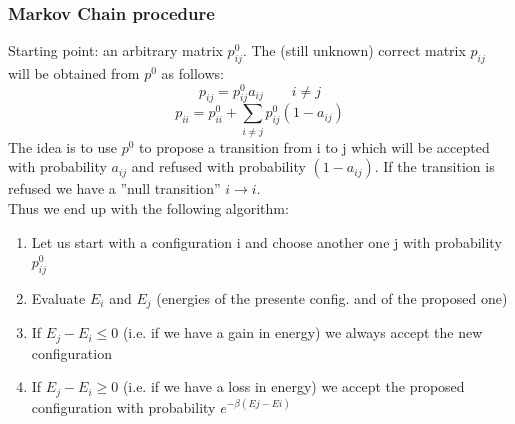     \subsubsection{Markov Chain procedure}
        Starting point: an arbitrary matrix $p^0_{ij}$. The (still unknown) correct matrix $p_{ij}$ will be obtained from $p^0$ as follows:
        $$
            p_{ij}=p^0_{ij}a_{ij}\qquad i\neq j 
        $$
        $$
            p_{ii}=p^0_{ii}+\displaystyle\sum_{i \neq j}p^0_{ij}(1-a_{ij})
        $$
        The idea is to use $p^0$ to propose a transition from i to j which will be accepted with probability $a_{ij}$ and refused with probability 
        $(1 - a_{ij})$. If the transition is refused we have a ”null transition” $i\rightarrow i$.\\
        Thus we end up with the following algorithm: \\
        \begin{enumerate}
            \item Let us start with a configuration i and choose another one j with probability $p^0_{ij}$
            \item Evaluate $E_i$ and $E_j$ (energies of the presente config. and of the proposed one)
            \item If $E_j - E_i \leq 0$ (i.e. if we have a gain in energy) we always accept the new configuration
            \item If $E_j - E_i \geq 0$ (i.e. if we have a loss in energy) we accept the proposed configuration with probability $e^{-\beta(Ej-Ei)}$
        \end{enumerate}

